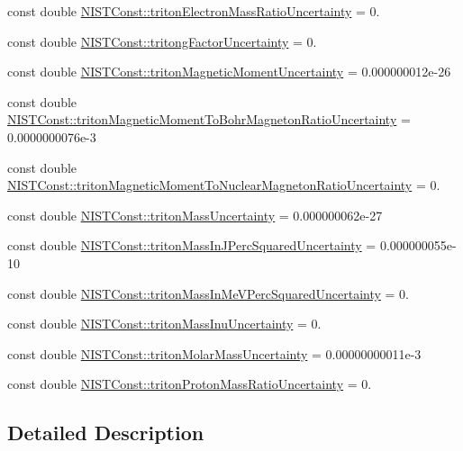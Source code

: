 \begin{DoxyCompactItemize}
\item 
const double \hyperlink{group___triton_ga43a36ee61c22d41cc102de17cdf9cb1b}{N\+I\+S\+T\+Const\+::triton\+Electron\+Mass\+Ratio\+Uncertainty} = 0.
\item 
const double \hyperlink{group___triton_ga824f5530282c21500ff7352e8378ed3d}{N\+I\+S\+T\+Const\+::tritong\+Factor\+Uncertainty} = 0.
\item 
const double \hyperlink{group___triton_ga8ea2250613d1058051f593174dd49d51}{N\+I\+S\+T\+Const\+::triton\+Magnetic\+Moment\+Uncertainty} = 0.\+000000012e-\/26
\item 
const double \hyperlink{group___triton_ga90cd9ae71d4a15d0b558ca26fc76a3b2}{N\+I\+S\+T\+Const\+::triton\+Magnetic\+Moment\+To\+Bohr\+Magneton\+Ratio\+Uncertainty} = 0.\+0000000076e-\/3
\item 
const double \hyperlink{group___triton_ga94375708a2cf3b8525660954fb92c624}{N\+I\+S\+T\+Const\+::triton\+Magnetic\+Moment\+To\+Nuclear\+Magneton\+Ratio\+Uncertainty} = 0.
\item 
const double \hyperlink{group___triton_gad151a313683f9e24ebd12e917f3905bb}{N\+I\+S\+T\+Const\+::triton\+Mass\+Uncertainty} = 0.\+000000062e-\/27
\item 
const double \hyperlink{group___triton_ga674bff21cbff4ff6e6591ce4cc78be70}{N\+I\+S\+T\+Const\+::triton\+Mass\+In\+J\+Perc\+Squared\+Uncertainty} = 0.\+000000055e-\/10
\item 
const double \hyperlink{group___triton_ga6fedf10502d91c9a164d6c7f0eae67d9}{N\+I\+S\+T\+Const\+::triton\+Mass\+In\+Me\+V\+Perc\+Squared\+Uncertainty} = 0.
\item 
const double \hyperlink{group___triton_ga5e2b2cf0ce15ac450f9a6ca418766347}{N\+I\+S\+T\+Const\+::triton\+Mass\+Inu\+Uncertainty} = 0.
\item 
const double \hyperlink{group___triton_gac5146732c0b02aee0b636ea942e54424}{N\+I\+S\+T\+Const\+::triton\+Molar\+Mass\+Uncertainty} = 0.\+00000000011e-\/3
\item 
const double \hyperlink{group___triton_ga80e5194cefd8b0a5620ab8708e04f78b}{N\+I\+S\+T\+Const\+::triton\+Proton\+Mass\+Ratio\+Uncertainty} = 0.
\end{DoxyCompactItemize}


\subsection{Detailed Description}


